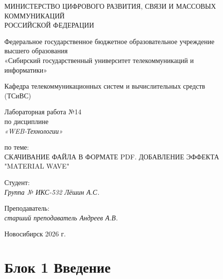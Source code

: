 \documentclass[a4paper,14pt,oneside,openany]{memoir}
\begin{document}
\thispagestyle{empty}

\begin{center}
    МИНИСТЕРСТВО ЦИФРОВОГО РАЗВИТИЯ, СВЯЗИ И МАССОВЫХ \\ КОММУНИКАЦИЙ \\ РОССИЙСКОЙ ФЕДЕРАЦИИ

    \vspace{20pt}

    Федеральное государственное бюджетное образовательное учреждение \\ высшего образования \\
    «Сибирский государственный университет телекоммуникаций и \\ информатики»

    \vspace{20pt}

    Кафедра телекоммуникационных систем и вычислительных средств \\ (ТСиВС)
\end{center}

\vfill

\begin{center}
    Лабораторная работа №14 \\
    по дисциплине \\
    \textit{«WEB-Технологии»}

    \vspace{20pt}

    по теме: \\
    \uppercase{Скачивание файла в формате PDF. Добавление эффекта "Material Wave"}
\end{center}

\vfill

\noindent Студент: \\
\textit{Группа № ИКС-532 \hfill Лёшин А.С.}

\vspace{20pt}

\noindent Преподаватель: \\
\textit{старший преподаватель \hfill Андреев А.В.}

\vfill

\begin{center}
    Новосибирск 2026 г.
\end{center}

\newpage
\setcounter{page}{2}
\OnehalfSpacing*

\section{Блок 1 Введение}
\end{document}

